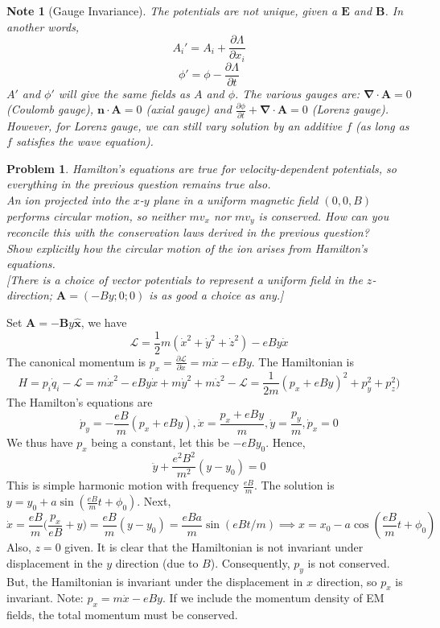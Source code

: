 \documentclass[a4paper]{article}
\newtheorem{note}{Note}[section]
\theoremstyle{new}
\newtheorem{qns}{Problem}[section]
\begin{document}
\begin{note}[Gauge Invariance]
The potentials are not unique, given a $\mathbf{E}$ and $\mathbf{B}$. In another words,
$$A_i'=A_i+\frac{\partial\Lambda}{\partial x_i}$$
$$\phi'=\phi-\frac{\partial\Lambda}{\partial t}$$
$A'$ and $\phi'$ will give the same fields as $A$ and $\phi$. The various gauges are: $\boldsymbol{\nabla}\cdot\mathbf{A}=0$ (Coulomb gauge), $\mathbf{n}\cdot\mathbf{A}=0$ (axial gauge) and $\frac{\partial\phi}{\partial t}+\boldsymbol{\nabla}\cdot\mathbf{A}=0$ (Lorenz gauge). However, for Lorenz gauge,  we can still vary solution by an additive $f$ (as long as $f$ satisfies the wave equation).
\end{note}
\begin{qns}
Hamilton’s equations are true for velocity-dependent potentials, so everything in the previous question remains true also.\\[5pt]
An ion projected into the $x$-$y$ plane in a uniform magnetic field $(0, 0,B)$ performs circular motion, so neither $mv_x$ nor $mv_y$ is conserved. How can you reconcile this with the conservation laws derived in the previous question?\\[5pt]
Show explicitly how the circular motion of the ion arises from Hamilton’s equations.\\[5pt]
[There is a choice of vector potentials to represent a uniform field in the $z$-direction; $\mathbf{A} =(-By; 0; 0)$ is as good a choice as any.]
\end{qns}
Set $\mathbf{A}=-\mathbf{B}y\mathbf{\hat{x}}$, we have
$$\mathcal{L}=\frac{1}{2}m(\dot{x}^2+\dot{y}^2+\dot{z}^2)-eBy\dot{x}$$
The canonical momentum is $p_x=\frac{\partial\mathcal{L}}{\partial\dot{x}}=m\dot{x}-eBy$. The Hamiltonian is 
$$H=p_i\dot{q}_i-\mathcal{L}=m\dot{x}^2-eBy\dot{x}+m\dot{y}^2+m\dot{z}^2-\mathcal{L}=\frac{1}{2m}(p_x+eBy)^2+p_y^2+p_z^2)$$
The Hamilton's equations are
$$\dot{p}_y=-\frac{eB}{m}(p_x+eBy),\dot{x}=\frac{p_x+eBy}{m},\dot{y}=\frac{p_y}{m},\dot{p}_x=0$$
We thus have $p_x$ being a constant, let this be $-eBy_0$. Hence,
$$\ddot{y}+\frac{e^2B^2}{m^2}(y-y_0)=0$$
This is simple harmonic motion with frequency $\frac{eB}{m}$. The solution is $y=y_0+a\sin(\frac{eB}{m}t+\phi_0)$. Next, 
$$\dot{x}=\frac{eB}{m}\bigg(\frac{p_x}{eB}+y\bigg)=\frac{eB}{m}(y-y_0)=\frac{eBa}{m}\sin(eBt/m)\implies x=x_0-a\cos(\frac{eB}{m}t+\phi_0)$$
Also, $z=0$ given. It is clear that the Hamiltonian is not invariant under displacement in the $y$ direction (due to $B$). Consequently, $p_y$ is not conserved. But, the Hamiltonian is invariant under the displacement in $x$ direction, so $p_x$ is invariant. Note: $p_x=m\dot{x}-eBy$. If we include the momentum density of EM fields, the total momentum must be conserved.
\end{document}
